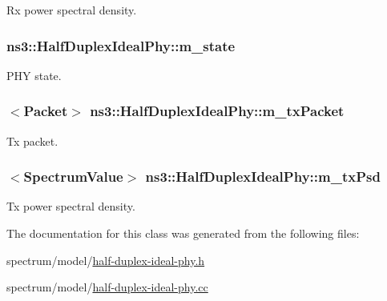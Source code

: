 Rx power spectral density. 

\subsubsection[{\texorpdfstring{m\+\_\+state}{m_state}}]{ ns3\+::\+Half\+Duplex\+Ideal\+Phy\+::m\+\_\+state\hspace{0.3cm}{\ttfamily [private]}}\hypertarget{classns3_1_1HalfDuplexIdealPhy_a6b5ae8a00ae9c4e50b2a099a534a1863}{}\label{classns3_1_1HalfDuplexIdealPhy_a6b5ae8a00ae9c4e50b2a099a534a1863}


P\+HY state. 

\subsubsection[{\texorpdfstring{m\+\_\+tx\+Packet}{m_txPacket}}]{$<${\bf Packet}$>$ ns3\+::\+Half\+Duplex\+Ideal\+Phy\+::m\+\_\+tx\+Packet\hspace{0.3cm}{\ttfamily [private]}}\hypertarget{classns3_1_1HalfDuplexIdealPhy_abdf5e830cf997ebddb20aa057198449e}{}\label{classns3_1_1HalfDuplexIdealPhy_abdf5e830cf997ebddb20aa057198449e}


Tx packet. 

\subsubsection[{\texorpdfstring{m\+\_\+tx\+Psd}{m_txPsd}}]{$<${\bf Spectrum\+Value}$>$ ns3\+::\+Half\+Duplex\+Ideal\+Phy\+::m\+\_\+tx\+Psd\hspace{0.3cm}{\ttfamily [private]}}\hypertarget{classns3_1_1HalfDuplexIdealPhy_aec3b3404be2ce3e803e134e27a79aae9}{}\label{classns3_1_1HalfDuplexIdealPhy_aec3b3404be2ce3e803e134e27a79aae9}


Tx power spectral density. 



The documentation for this class was generated from the following files\+:\begin{DoxyCompactItemize}
\item 
spectrum/model/\hyperlink{half-duplex-ideal-phy_8h}{half-\/duplex-\/ideal-\/phy.\+h}\item 
spectrum/model/\hyperlink{half-duplex-ideal-phy_8cc}{half-\/duplex-\/ideal-\/phy.\+cc}\end{DoxyCompactItemize}
